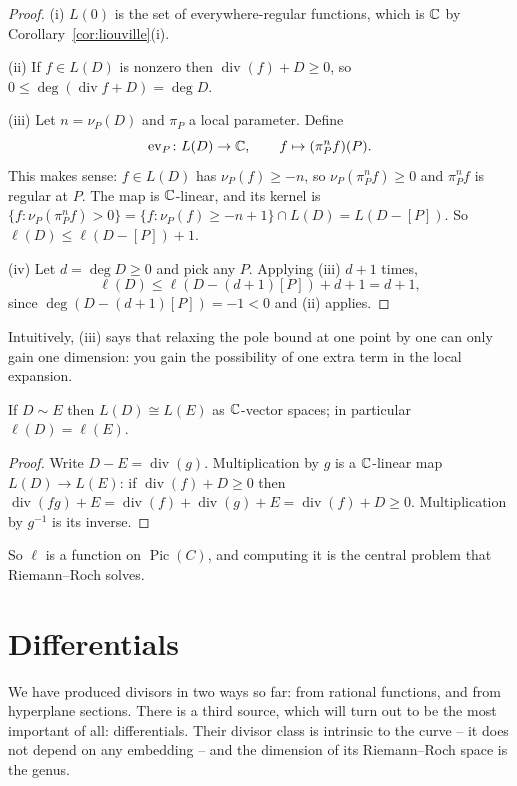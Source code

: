 \documentclass[a4paper]{scrartcl}
\DeclareMathOperator{\Divv}{div}
\DeclareMathOperator{\Pic}{Pic}
\begin{document}
\begin{proof}
	(i) $L(0)$ is the set of everywhere-regular functions, which is $\mathbb{C}$ by Corollary~\ref{cor:liouville}(i).

	(ii) If $f \in L(D)$ is nonzero then $\Divv(f) + D \geq 0$, so $0 \leq \deg(\Divv f + D) = \deg D$.

	(iii) Let $n = \nu_P(D)$ and $\pi_P$ a local parameter. Define
	$$\mathrm{ev}_P \colon L(D) \to \mathbb{C}, \qquad f \mapsto (\pi_P^{n}f)(P).$$
	This makes sense: $f \in L(D)$ has $\nu_P(f)\geq -n$, so $\nu_P(\pi_P^nf)\geq 0$ and $\pi_P^nf$ is regular at $P$. The map is $\mathbb{C}$-linear, and its kernel is $\{f : \nu_P(\pi_P^nf) > 0\} = \{f : \nu_P(f) \geq -n+1\} \cap L(D) = L(D - [P])$. So $\ell(D) \leq \ell(D-[P]) + 1$.

	(iv) Let $d = \deg D \geq 0$ and pick any $P$. Applying (iii) $d+1$ times,
	$$\ell(D) \leq \ell(D - (d+1)[P]) + d + 1 = d+1,$$
	since $\deg(D - (d+1)[P]) = -1 < 0$ and (ii) applies.
\end{proof}

Intuitively, (iii) says that relaxing the pole bound at one point by one can only gain one dimension: you gain the possibility of one extra term in the local expansion.

\begin{proposition}\label{prop:Lsim}
	If $D \sim E$ then $L(D)\cong L(E)$ as $\mathbb{C}$-vector spaces; in particular $\ell(D) = \ell(E)$.
\end{proposition}

\begin{proof}
	Write $D - E = \Divv(g)$. Multiplication by $g$ is a $\mathbb{C}$-linear map $L(D)\to L(E)$: if $\Divv(f)+D\geq0$ then $\Divv(fg) + E = \Divv(f) + \Divv(g) + E = \Divv(f)+D \geq 0$. Multiplication by $g^{-1}$ is its inverse.
\end{proof}

So $\ell$ is a function on $\Pic(C)$, and computing it is the central problem that Riemann--Roch solves.

\section{Differentials}\label{sec:differentials}

We have produced divisors in two ways so far: from rational functions, and from hyperplane sections. There is a third source, which will turn out to be the most important of all: differentials. Their divisor class is intrinsic to the curve -- it does not depend on any embedding -- and the dimension of its Riemann--Roch space is the genus.
\end{document}
